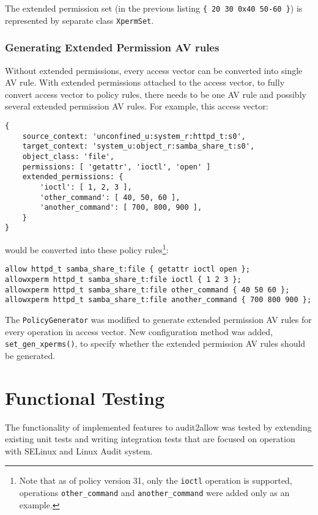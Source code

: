 The extended permission set (in the previous listing \texttt{\{ 20 30 0x40 50-60
\}}) is represented by separate class \texttt{XpermSet}.

\subsection{Generating Extended Permission AV rules}
Without extended permissions, every access vector can be converted into single
AV rule. With extended permissions attached to the access vector, to fully
convert access vector to policy rules, there needs to be one AV rule and
possibly several extended permission AV rules. For example, this access vector:
\begin{lstlisting}
{
    source_context: 'unconfined_u:system_r:httpd_t:s0',
    target_context: 'system_u:object_r:samba_share_t:s0',
    object_class: 'file',
    permissions: [ 'getattr', 'ioctl', 'open' ]
    extended_permissions: {
        'ioctl': [ 1, 2, 3 ],
        'other_command': [ 40, 50, 60 ],
        'another_command': [ 700, 800, 900 ],
    }
}
\end{lstlisting}
would be converted into these policy rules\footnote{Note that as of policy
version 31, only the \texttt{ioctl} operation is supported, operations
\texttt{other\_command} and \texttt{another\_command} were added only as an
example.}:
\begin{lstlisting}
allow httpd_t samba_share_t:file { getattr ioctl open };
allowxperm httpd_t samba_share_t:file ioctl { 1 2 3 };
allowxperm httpd_t samba_share_t:file other_command { 40 50 60 };
allowxperm httpd_t samba_share_t:file another_command { 700 800 900 };
\end{lstlisting}

The \texttt{PolicyGenerator} was modified to generate extended permission AV
rules for every operation in access vector. New configuration method was added,
\texttt{set\_gen\_xperms()}, to specify whether the extended permission AV rules
should be generated.

\chapter{Functional Testing}
The functionality of implemented features to audit2allow was tested by extending
existing unit tests and writing integration tests that are focused on operation
with SELinux and Linux Audit system.

